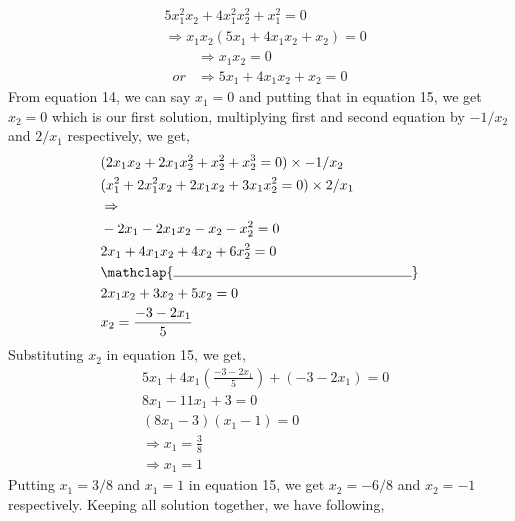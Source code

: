 \documentclass[a4paper,10pt]{article}
\begin{document}
\begin{enumerate}
\begin{equation}
\begin{split}
          & 5x_1^2x_2 + 4x_1^2x_2^2 + x_1^2 = 0 \\ 
          & \Rightarrow x_1x_2(5x_1 + 4x_1x_2 + x_2) = 0 
        \end{split}
    \end{equation}
    \begin{equation}
    \begin{split}
        & \Rightarrow x_1x_2 = 0  \\
         or & \Rightarrow 5x_1 + 4x_1x_2 + x_2 = 0 
    \end{split}
    \end{equation}
    From equation 14, we can say $x_1 = 0$ and putting that in equation 15, we get $x_2 = 0$ which is our first solution, multiplying first and second equation by $-1/x_2$ and $2/x_1$ respectively, we get,
    \begin{equation}
        \begin{split}
           & (2x_1x_2 + 2x_1x_2^2 + x_2^2 + x_2^3 = 0) \times -1/x_2\\
          & (x_1^2 + 2x_1^2x_2 + 2x_1x_2 + 3x_1x_2^2 = 0) \times 2/x_1 \\
          & \Rightarrow \\
          & - 2x_1 - 2x_1x_2 - x_2 - x_2^2 = 0 \\
          & 2x_1 + 4x_1x_2 + 4x_2 + 6x_2^2 = 0 \\
          & \mathclap{\rule{6cm}{0.4pt}}\\
          & 2x_1x_2 + 3x_2 + 5x_2 = 0 \\ 
          & x_2 = \frac{-3-2x_1}{5}
        \end{split}
    \end{equation}
    Substituting $x_2$ in equation 15, we get,
    \begin{equation}
        \begin{split}
          & 5x_1 + 4x_1(\frac{-3-2x_1}{5}) + (-3-2x_1)  = 0 \\
          & 8x_1 - 11x_1 + 3 = 0  \\
          & (8x_1-3)(x_1-1)=0 \\
          & \Rightarrow x_1 = \frac{3}{8}  \\
          & \Rightarrow x_1 = 1
        \end{split}
    \end{equation}
    Putting $x_1=3/8$ and $x_1=1$ in equation 15, we get $x_2=-6/8$ and $x_2=-1$ respectively. Keeping all solution together, we have following,
    \begin{center}

\end{center}
\end{enumerate}
\end{document}

